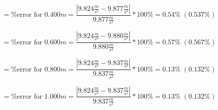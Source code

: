 \begin{equation}
  = \text{\%error for 0.400$m$} = \frac{|9.824\frac{m}{s^2} - 9.877\frac{m}{s^2}|}{9.877\frac{m}{s^2}} * 100\% = 0.54\% \; (0.537\%)
\end{equation}

\begin{equation}
  = \text{\%error for 0.600$m$} = \frac{|9.824\frac{m}{s^2} - 9.880\frac{m}{s^2}|}{9.880\frac{m}{s^2}} * 100\% = 0.57\% \; (0.567\%)
\end{equation}

\begin{equation}
  = \text{\%error for 0.800$m$} = \frac{|9.824\frac{m}{s^2} - 9.837\frac{m}{s^2}|}{9.837\frac{m}{s^2}} * 100\% = 0.13\% \; (0.132\%)
\end{equation}

\begin{equation}
  = \text{\%error for 1.000$m$} = \frac{|9.824\frac{m}{s^2} - 9.837\frac{m}{s^2}|}{9.837\frac{m}{s^2}} * 100\% = 0.13\% \; (0.132\%)
\end{equation}
